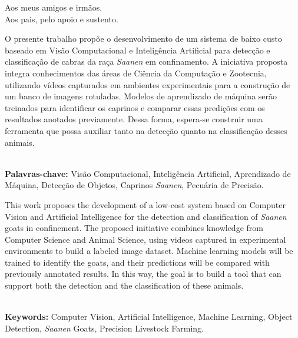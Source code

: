 \documentclass[a4paper,12pt]{monografia}
\theoremstyle{plain}
\theoremstyle{definition}
\theoremstyle{remark}
\begin{document}


\begin{dedicatoria}
  Aos meus amigos e irmãos.\\
  Aos pais, pelo apoio e sustento.\\
\end{dedicatoria}

O presente trabalho propõe o desenvolvimento de um sistema de baixo custo baseado em Visão Computacional e Inteligência Artificial para detecção e classificação de cabras da raça \textit{Saanen} em confinamento. A iniciativa proposta integra conhecimentos das áreas de Ciência da Computação e Zootecnia, utilizando vídeos capturados em ambientes experimentais para a construção de um banco de imagens rotuladas. Modelos de aprendizado de máquina serão treinados para identificar os caprinos e comparar essas predições com os resultados anotados previamente. Dessa forma, espera-se construir uma ferramenta que possa auxiliar tanto na detecção quanto na classificação desses animais.

\noindent \\ \textbf{Palavras-chave:} Visão Computacional, Inteligência Artificial, Aprendizado de Máquina, Detecção de Objetos, Caprinos \textit{Saanen}, Pecuária de Precisão.

 This work proposes the development of a low-cost system based on Computer Vision and Artificial Intelligence for the detection and classification of \textit{Saanen} goats in confinement. The proposed initiative combines knowledge from Computer Science and Animal Science, using videos captured in experimental environments to build a labeled image dataset. Machine learning models will be trained to identify the goats, and their predictions will be compared with previously annotated results. In this way, the goal is to build a tool that can support both the detection and the classification of these animals.

\noindent \\ \textbf{Keywords:} Computer Vision, Artificial Intelligence, Machine Learning, Object Detection, \textit{Saanen} Goats, Precision Livestock Farming.

\end{document}
